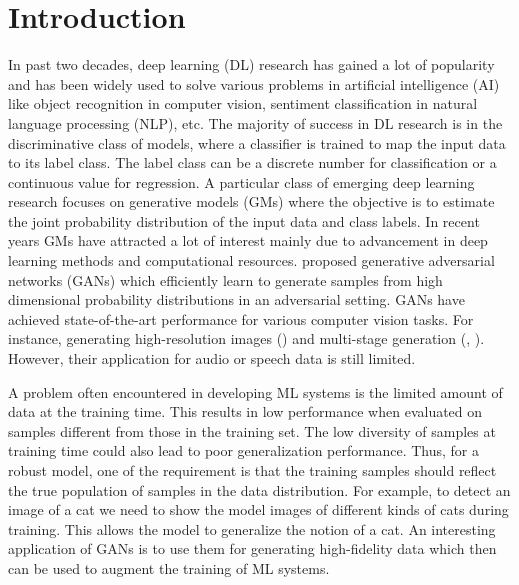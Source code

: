 \chapter{Introduction}
\label{ch:introduction}
In past two decades, deep learning (DL) research has gained a lot of popularity and has been widely used to solve various problems in artificial intelligence (AI) like object recognition in computer vision, sentiment classification in natural language processing (NLP), etc. The majority of success in DL research is in the discriminative class of models, where a classifier is trained to map the input data to its label class. The label class can be a discrete number for classification or a continuous value for regression.
A particular class of emerging deep learning research focuses on generative models (GMs) where the objective is to estimate the joint probability distribution of the input data and class labels. In recent years GMs have attracted a lot of interest mainly due to advancement in deep learning methods and computational resources. \citet{goodfellow2014generative} proposed generative adversarial networks (GANs) which efficiently learn to generate samples from high dimensional probability distributions in an adversarial setting. GANs have achieved state-of-the-art performance for various computer vision tasks. For instance, generating high-resolution images (\cite{karras2017progressive}) and multi-stage generation (\cite{denton2015deep}, \cite{karras2017progressive}). However, their application for audio or speech data is still limited. 

A problem often encountered in developing ML systems is the limited amount of data at the training time. This results in low performance when evaluated on samples different from those in the training set. The low diversity of samples at training time could also lead to poor generalization performance.
Thus, for a robust model, one of the requirement is that the training samples should reflect the true population of samples in the data distribution. For example, to detect an image of a cat we need to show the model images of different kinds of cats during training. This allows the model to generalize the notion of a cat. An interesting application of GANs is to use them for generating high-fidelity data which then can be used to augment the training of ML systems. 

